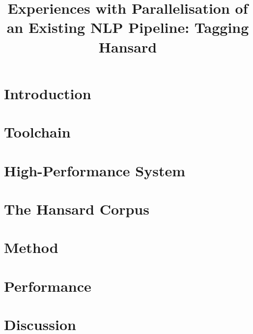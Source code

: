 \documentclass[10pt, a4paper]{article}
\title{Experiences with Parallelisation of an Existing NLP Pipeline: Tagging Hansard}
\begin{document}
\maketitleabstract%

\section{Introduction}


\section{Toolchain}



\section{High-Performance System}



\section{The Hansard Corpus}



\section{Method}



\section{Performance}




\section{Discussion}







\end{document}
